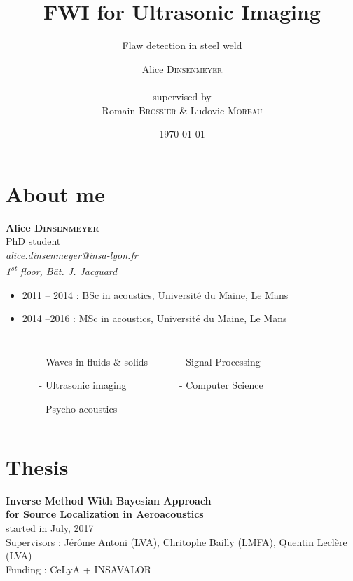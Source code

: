 \documentclass[11pt,xcolor=x11names,compress, notes=show]{beamer}%
\author{Alice \textsc{Dinsenmeyer} \\~\\ supervised by \\ Romain \textsc{Brossier} \& Ludovic \textsc{Moreau}}
\title{FWI for Ultrasonic Imaging}
\subtitle{Flaw detection in steel weld}
\date{\small \today}
\begin{document}
\section{About me}


\begin{frame}
	\begin{center}
		\textbf{Alice \textsc{Dinsenmeyer}}\\
		\footnotesize{PhD student\\[0.5cm]
		\textit{alice.dinsenmeyer@insa-lyon.fr\\
		1\textsuperscript{st} floor, Bât. J. Jacquard}}
			
	\end{center}
	\begin{itemize}
		\item 2011 -- 2014 : BSc in acoustics, Université du Maine, Le Mans %
		\item 2014 --2016 : MSc in acoustics, Université du Maine, Le Mans %
		\begin{columns}
			\hspace{2cm}
			\begin{itemize}
				\item[-] Waves in fluids \& solids
				\item[-] Ultrasonic imaging
				\item[-] Psycho-acoustics
			\end{itemize}
			\begin{itemize}
				\item[-] Signal Processing
				\item[-] Computer Science
			\end{itemize}
		\end{columns}
	\end{itemize}
\end{frame}

\section{Thesis}


\begin{frame}
	\centering
	\textbf{ Inverse Method With Bayesian Approach \\for Source Localization in Aeroacoustics}\\
	\footnotesize{started in July, 2017}\\[0.5cm]
	Supervisors : Jérôme Antoni (LVA), Chritophe Bailly (LMFA), Quentin Leclère (LVA)\\[0.5cm]
	Funding : CeLyA + INSAVALOR
\end{frame}
\end{document}
